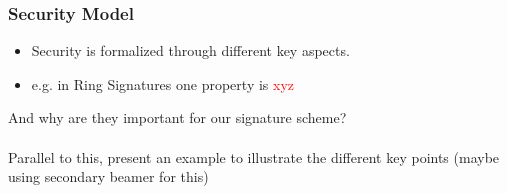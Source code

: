 \begin{frame}
	\frametitle{Security Model}

	\begin{itemize}
		\item Security is formalized through different key aspects.
		\item e.g. in Ring Signatures one property is \textcolor{red}{xyz}
	\end{itemize}

	And why are they important for our signature scheme?\\
	~\\
	Parallel to this, present an example to illustrate the different key points (maybe using secondary beamer for this)
\end{frame}